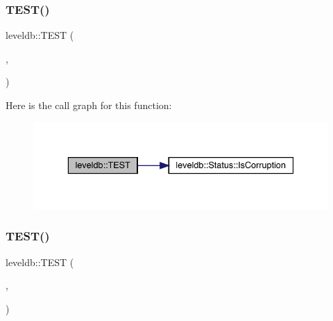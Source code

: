 \mbox{\label{namespaceleveldb_a727ff74a5eed159af6eff4255e8847aa}} 
\subsubsection{\texorpdfstring{TEST()}{TEST()}\hspace{0.1cm}{\footnotesize\ttfamily [39/102]}}
{\footnotesize\ttfamily leveldb\+::\+T\+E\+ST (\begin{DoxyParamCaption}\item[{\mbox{\hyperlink{classleveldb_1_1_recovery_test}{Recovery\+Test}}}]{,  }\item[{Manifest\+Missing}]{ }\end{DoxyParamCaption})}

Here is the call graph for this function\+:
\nopagebreak
\begin{figure}[H]
\begin{center}
\leavevmode
\includegraphics[width=336pt]{namespaceleveldb_a727ff74a5eed159af6eff4255e8847aa_cgraph}
\end{center}
\end{figure}
\mbox{\label{namespaceleveldb_a2bb2a098a32d42044e6be132020b29b0}} 
\subsubsection{\texorpdfstring{TEST()}{TEST()}\hspace{0.1cm}{\footnotesize\ttfamily [40/102]}}
{\footnotesize\ttfamily leveldb\+::\+T\+E\+ST (\begin{DoxyParamCaption}\item[{\mbox{\hyperlink{classleveldb_1_1_corruption_test}{Corruption\+Test}}}]{,  }\item[{Compaction\+Input\+Error\+Paranoid}]{ }\end{DoxyParamCaption})}

\mbox{\label{namespaceleveldb_adbafd76c895bbb400c6aa4ad6e0eae2e}} 
